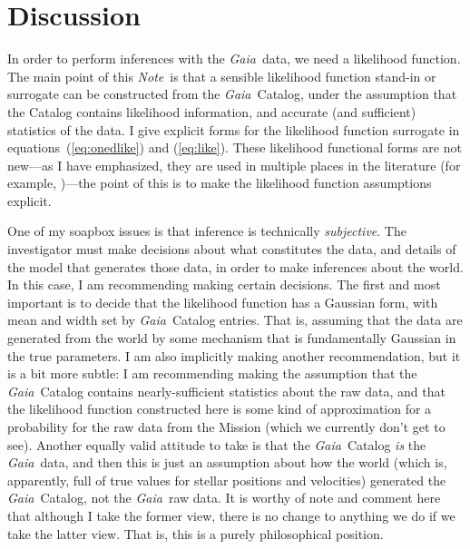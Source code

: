 \documentclass[12pt, modern]{aastex62h}
\newcommand{\Gaia}{\textsl{Gaia}}
\newcommand{\documentname}{\textsl{Note}}
\newcommand{\equationname}{equation}
\begin{document}
\section{Discussion}
In order to perform inferences
with the \Gaia\ data, we need a likelihood function.
The main point of this \documentname\ is that a sensible likelihood function
stand-in or surrogate can be constructed from the \Gaia\ Catalog, under the assumption
that the Catalog contains likelihood information, and accurate (and sufficient)
statistics of the data.
I give explicit forms for the likelihood function surrogate in
\equationname s~(\ref{eq:onedlike}) and (\ref{eq:like}).
These likelihood functional forms are not new---as I have emphasized,
they are used in multiple places
in the literature (for example, \citealt{tri2, leistedt, oh, delgado})---the point of
this is to make the
likelihood function assumptions explicit.

One of my soapbox issues is that inference is technically \emph{subjective}.
The investigator must make decisions about what constitutes the data,
and details of the model that generates those data, in order to make
inferences about the world.
In this case, I am recommending making certain decisions.
The first and most important is to decide that the likelihood function
has a Gaussian form, with mean and width set by \Gaia\ Catalog entries.
That is, assuming that the data are generated from the world by some mechanism
that is fundamentally Gaussian in the true parameters.
I am also implicitly making another recommendation, but it is a bit more
subtle:
I am recommending making the assumption that the \Gaia\ Catalog contains
nearly-sufficient statistics about the raw data, and that the likelihood function
constructed here is some kind of approximation for a probability for the raw data
from the Mission (which we currently don't get to see).
Another equally valid attitude to take is that the \Gaia\ Catalog
\emph{is}
the \Gaia\ data, and then this is just an assumption about how the world
(which is, apparently, full of true values for stellar positions and velocities)
generated the \Gaia\ Catalog, not the \Gaia\ raw data.
It is worthy of note and comment here that although I take the former view,
there is no change to anything we do if we take the latter view.
That is, this is a purely philosophical position.
\end{document}
